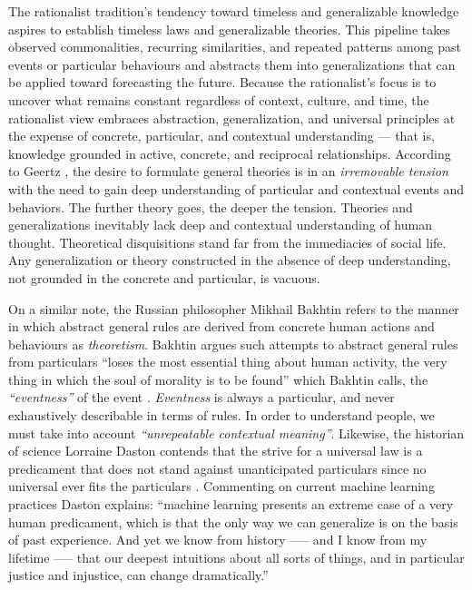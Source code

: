 The rationalist tradition's tendency toward timeless and generalizable knowledge aspires to establish timeless laws and generalizable theories. This pipeline takes observed commonalities, recurring similarities, and repeated patterns among past events or particular behaviours and abstracts them into generalizations that can be applied toward forecasting the future. Because the rationalist's focus is to uncover what remains constant regardless of context, culture, and time, the rationalist view embraces abstraction, generalization, and universal principles at the expense of concrete, particular, and contextual understanding — that is, knowledge grounded in active, concrete, and reciprocal relationships. According to Geertz \cite{geertz1973interpretation}, the desire to formulate general theories is in an \textit{irremovable tension} with the need to gain deep understanding of particular and contextual events and behaviors. The further theory goes, the deeper the tension. Theories and generalizations inevitably lack deep and contextual understanding of human thought. Theoretical disquisitions stand far from the immediacies of social life. Any generalization or theory constructed in the absence of deep understanding, not grounded in the concrete and particular, is vacuous.

On a similar note, the Russian philosopher Mikhail Bakhtin refers to the manner in which abstract general rules are derived from concrete human actions and behaviours as \textit{theoretism}. Bakhtin argues such attempts to abstract general rules from particulars ``loses the most essential thing about human activity, the very thing in which the soul of morality is to be found'' which Bakhtin calls, the \textit{``eventness''} of the event \cite{morson1989rethinking}. \textit{Eventness} is always a particular, and never exhaustively describable in terms of rules. In order to understand people, we must take into account \textit{``unrepeatable contextual meaning''}. Likewise, the historian of science Lorraine Daston contends that the strive for a universal law is a predicament that does not stand against unanticipated particulars since no universal ever fits the particulars \cite{daston2018calculation}. Commenting on current machine learning practices Daston \cite{Gross2020} explains: ``machine learning presents an extreme case of a very human predicament, which is that the only way we can generalize is on the basis of past experience. And yet we know from history —-- and I know from my lifetime —-- that our deepest intuitions about all sorts of things, and in particular justice and injustice, can change dramatically.''

